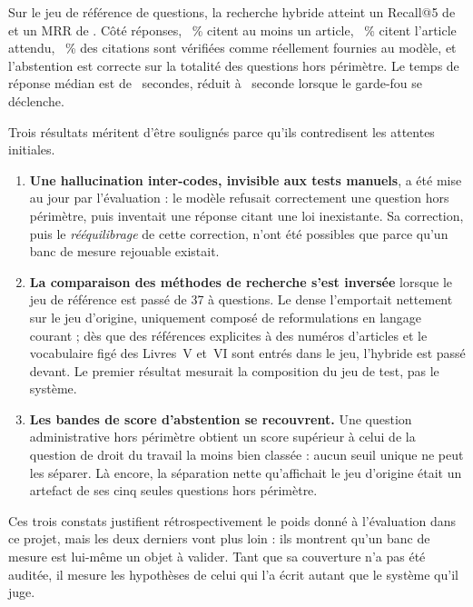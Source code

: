 Sur le jeu de référence de \NbQuestions{} questions, la recherche hybride atteint un Recall@5 de
\RecallHybride{} et un MRR de \MrrHybride{}. Côté réponses, \TauxCitation~\% citent au moins un
article, \TauxSourceAttendue~\% citent l'article attendu, \TauxVerif~\% des citations sont
vérifiées comme réellement fournies au modèle, et l'abstention est correcte sur la totalité des
questions hors périmètre. Le temps de réponse médian est de \LatTotale~secondes, réduit à
\LatAbstention~seconde lorsque le garde-fou se déclenche.

Trois résultats méritent d'être soulignés parce qu'ils contredisent les attentes initiales.

\begin{enumerate}
  \item \textbf{Une hallucination inter-codes, invisible aux tests manuels}, a été mise au jour par
        l'évaluation : le modèle refusait correctement une question hors périmètre, puis inventait
        une réponse citant une loi inexistante. Sa correction, puis le \emph{rééquilibrage} de
        cette correction, n'ont été possibles que parce qu'un banc de mesure rejouable existait.
  \item \textbf{La comparaison des méthodes de recherche s'est inversée} lorsque le jeu de
        référence est passé de 37 à \NbQuestions{} questions. Le dense l'emportait nettement sur le
        jeu d'origine, uniquement composé de reformulations en langage courant ; dès que des
        références explicites à des numéros d'articles et le vocabulaire figé des Livres~V et~VI
        sont entrés dans le jeu, l'hybride est passé devant. Le premier résultat mesurait la
        composition du jeu de test, pas le système.
  \item \textbf{Les bandes de score d'abstention se recouvrent.} Une question administrative hors
        périmètre obtient un score supérieur à celui de la question de droit du travail la moins
        bien classée : aucun seuil unique ne peut les séparer. Là encore, la séparation nette
        qu'affichait le jeu d'origine était un artefact de ses cinq seules questions hors
        périmètre.
\end{enumerate}

Ces trois constats justifient rétrospectivement le poids donné à l'évaluation dans ce projet, mais
les deux derniers vont plus loin : ils montrent qu'un banc de mesure est lui-même un objet à
valider. Tant que sa couverture n'a pas été auditée, il mesure les hypothèses de celui qui l'a
écrit autant que le système qu'il juge.

